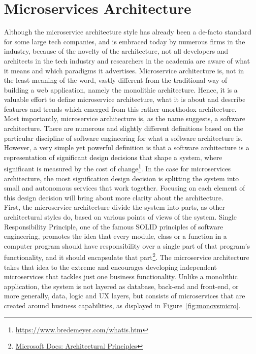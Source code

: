 \documentclass{Configuration_Files/PoliMi3i_thesis}
\begin{document}
\section{Microservices Architecture}
\label{sec:ms_arch}

Although the microservice architecture style has already been a de-facto standard for some large tech companies, and is embraced today by numerous firms in the industry, because of the novelty of the architecture, not all developers and architects in the tech industry and researchers in the academia are aware of what it means and which paradigms it advertises.
Microservice architecture is, not in the least meaning of the word, vastly different from the traditional way of building a web application, namely the monolithic architecture.
Hence, it is a valuable effort to define microservice architecture, what it is about and describe features and trends which emerged from this rather unorthodox architecture.
\\
Most importantly, microservice architecture is, as the name suggests, a software architecture.
There are numerous and slightly different definitions based on the particular discipline of software engineering for what a software architecture is.
However, a very simple yet powerful definition is that a software architecture is a representation of significant design decisions that shape a system, where significant is measured by the cost of change\footnote{\href{https://www.bredemeyer.com/whatis.htm}{https://www.bredemeyer.com/whatis.htm}}. 
In the case for microservices architecture, the most signification design decision is splitting the system into small and autonomous services that work together.
Focusing on each element of this design decision will bring about more clarity about the architecture.
\\
First, the microservice architecture divide the system into parts, as other architectural styles do, based on various points of views of the system.
Single Responsibility Principle, one of the famous SOLID principles of software engineering, promotes the idea that every module, class or a function in a computer program should have responsibility over a single part of that program's functionality, and it should encapsulate that part\footnote{\href{https://docs.microsoft.com/en-us/dotnet/architecture/modern-web-apps-azure/architectural-principles}{Microsoft Docs: Architectural Principles}}.
The microservice architecture takes that idea to the extreme and encourages developing independent microservices that tackles just one business functionality.
Unlike a monolithic application, the system is not layered as database, back-end and front-end, or more generally, data, logic and UX layers, but consists of microservices that are created around business capabilities, as displayed in Figure~\ref{fig:monovsmicro}.
\end{document}
